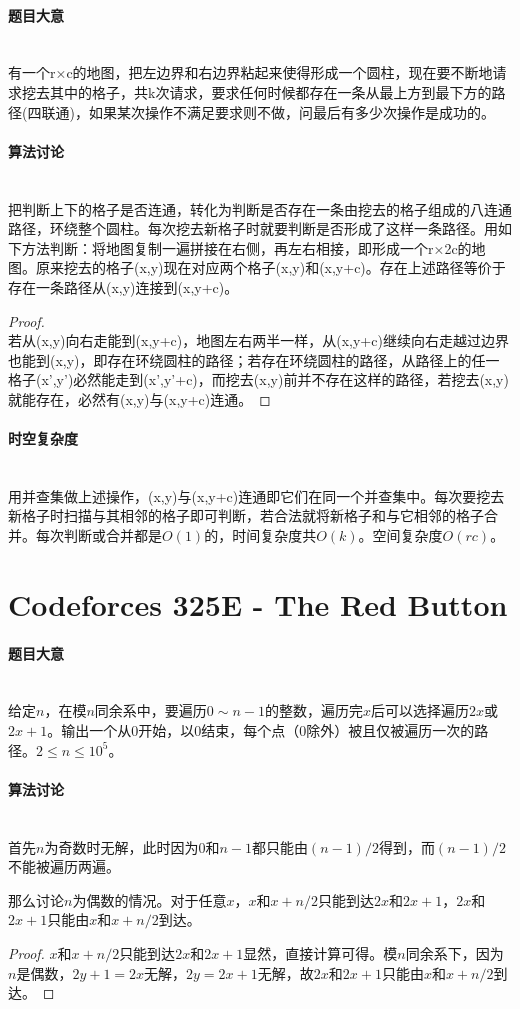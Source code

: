 \documentclass[UTF8]{ctexart}
\newcommand{\myparagraph}[1]{\paragraph{#1}\mbox{}\\}
\theoremstyle{nonumberplain}
\newtheorem{proof}{\hspace{1em}证明：}
\begin{document}
		\myparagraph{题目大意}
		
			有一个r×c的地图，把左边界和右边界粘起来使得形成一个圆柱，现在要不断地请求挖去其中的格子，共k次请求，要求任何时候都存在一条从最上方到最下方的路径(四联通)，如果某次操作不满足要求则不做，问最后有多少次操作是成功的。
		
		\myparagraph{算法讨论}
		
			把判断上下的格子是否连通，转化为判断是否存在一条由挖去的格子组成的八连通路径，环绕整个圆柱。每次挖去新格子时就要判断是否形成了这样一条路径。用如下方法判断：将地图复制一遍拼接在右侧，再左右相接，即形成一个r×2c的地图。原来挖去的格子(x,y)现在对应两个格子(x,y)和(x,y+c)。存在上述路径等价于存在一条路径从(x,y)连接到(x,y+c)。
			
			\begin{proof}\mbox{}\\
			
				若从(x,y)向右走能到(x,y+c)，地图左右两半一样，从(x,y+c)继续向右走越过边界也能到(x,y)，即存在环绕圆柱的路径；若存在环绕圆柱的路径，从路径上的任一格子(x',y')必然能走到(x',y'+c)，而挖去(x,y)前并不存在这样的路径，若挖去(x,y)就能存在，必然有(x,y)与(x,y+c)连通。
			
			\end{proof}
		
		\myparagraph{时空复杂度}
		
			用并查集做上述操作，(x,y)与(x,y+c)连通即它们在同一个并查集中。每次要挖去新格子时扫描与其相邻的格子即可判断，若合法就将新格子和与它相邻的格子合并。每次判断或合并都是$O(1)$的，时间复杂度共$O(k)$。空间复杂度$O(rc)$。
	
	\section{Codeforces 325E - The Red Button}
	
		\myparagraph{题目大意}
		
			给定$n$，在模$n$同余系中，要遍历$0 \sim n-1$的整数，遍历完$x$后可以选择遍历$2x$或$2x+1$。输出一个从0开始，以0结束，每个点（0除外）被且仅被遍历一次的路径。$2 \leq n \leq 10^5$。
		
		\myparagraph{算法讨论}
		
			首先$n$为奇数时无解，此时因为0和$n-1$都只能由$(n-1)/2$得到，而$(n-1)/2$不能被遍历两遍。
			
			那么讨论$n$为偶数的情况。对于任意$x$，$x$和$x+n/2$只能到达$2x$和$2x+1$，$2x$和$2x+1$只能由$x$和$x+n/2$到达。
			
			\begin{proof} $x$和$x+n/2$只能到达$2x$和$2x+1$显然，直接计算可得。模$n$同余系下，因为$n$是偶数，$2y+1=2x$无解，$2y=2x+1$无解，故$2x$和$2x+1$只能由$x$和$x+n/2$到达。 \end{proof}
			
\end{document}
